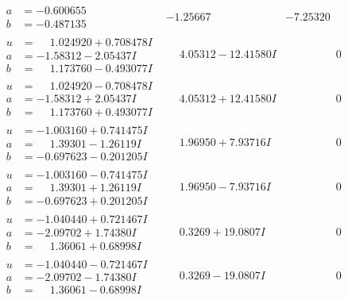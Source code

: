 \documentclass[1p]{elsarticle_modified}
\theoremstyle{definition}
\begin{document}
$$\begin{array}{c|c|c}
\begin{aligned}
a &= -0.600655\phantom{ +0.000000I} \\
b &= -0.487135\phantom{ +0.000000I}\end{aligned}
 & -1.25667\phantom{ +0.000000I} & -7.25320\phantom{ +0.000000I} \\ \hline\begin{aligned}
u &= \phantom{-}1.024920 + 0.708478 I \\
a &= -1.58312 - 2.05437 I \\
b &= \phantom{-}1.173760 - 0.493077 I\end{aligned}
 & \phantom{-}4.05312 - 12.41580 I & \phantom{-0.000000 } 0 \\ \hline\begin{aligned}
u &= \phantom{-}1.024920 - 0.708478 I \\
a &= -1.58312 + 2.05437 I \\
b &= \phantom{-}1.173760 + 0.493077 I\end{aligned}
 & \phantom{-}4.05312 + 12.41580 I & \phantom{-0.000000 } 0 \\ \hline\begin{aligned}
u &= -1.003160 + 0.741475 I \\
a &= \phantom{-}1.39301 - 1.26119 I \\
b &= -0.697623 - 0.201205 I\end{aligned}
 & \phantom{-}1.96950 + 7.93716 I & \phantom{-0.000000 } 0 \\ \hline\begin{aligned}
u &= -1.003160 - 0.741475 I \\
a &= \phantom{-}1.39301 + 1.26119 I \\
b &= -0.697623 + 0.201205 I\end{aligned}
 & \phantom{-}1.96950 - 7.93716 I & \phantom{-0.000000 } 0 \\ \hline\begin{aligned}
u &= -1.040440 + 0.721467 I \\
a &= -2.09702 + 1.74380 I \\
b &= \phantom{-}1.36061 + 0.68998 I\end{aligned}
 & \phantom{-}0.3269 + 19.0807 I & \phantom{-0.000000 } 0 \\ \hline\begin{aligned}
u &= -1.040440 - 0.721467 I \\
a &= -2.09702 - 1.74380 I \\
b &= \phantom{-}1.36061 - 0.68998 I\end{aligned}
 & \phantom{-}0.3269 - 19.0807 I & \phantom{-0.000000 } 0 \\ \hline\begin{aligned}

\end{aligned}
\end{array}$$
\end{document}
